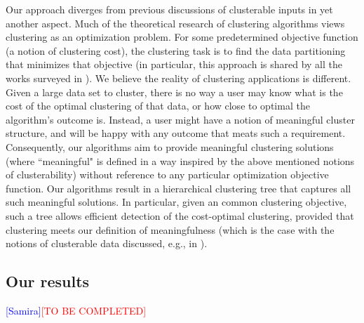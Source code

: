\documentclass[anon,12pt]{colt2016} %
\newcommand{\complete}{\textcolor{red}{[TO BE COMPLETED]}\xspace}
\newcommand{\samira}{\textcolor{blue}{[Samira]}\xspace}
\begin{document}
Our approach diverges from previous discussions of clusterable inputs in yet another aspect. Much of the theoretical research of clustering algorithms views clustering as an optimization problem. For some predetermined objective function (a notion of clustering cost), the clustering task is to find the data partitioning that minimizes that objective  (in particular, this approach is shared by all the works surveyed in \cite{ben2015computational}). We believe the reality of clustering applications is different. Given a large data set to cluster, there is no way a user may know what is the cost of the optimal clustering of that data, or how close to optimal the algorithm's outcome is. Instead, a user might have a notion of meaningful cluster structure, and will be happy with any outcome that meats such a requirement. Consequently, our algorithms aim to provide meaningful clustering solutions (where ``meaningful" is defined in a way inspired by the above mentioned notions of clusterability) without reference to any particular optimization objective function. Our algorithms result in a hierarchical clustering tree that captures all such meaningful solutions. In particular, given an common clustering objective, such a tree allows efficient detection of the cost-optimal clustering, provided that clustering meets our definition of meaningfulness (which is the case with the notions of clusterable data discussed, e.g., in \cite{balcan2012clustering}).

\subsection{Our results}
\samira\complete

\end{document}
